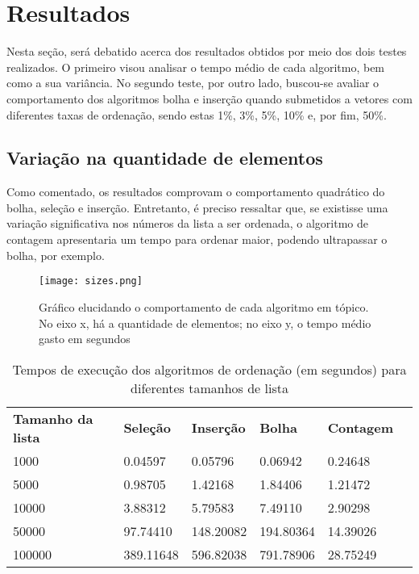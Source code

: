 \section{Resultados}
Nesta seção, será debatido acerca dos resultados obtidos por meio dos dois testes realizados. O primeiro visou analisar o tempo médio de cada algoritmo, bem como a sua variância. 
No segundo teste, por outro lado, buscou-se avaliar o comportamento dos algoritmos bolha e inserção quando submetidos a vetores com diferentes taxas de ordenação, sendo estas 1\%, 3\%, 5\%, 10\% e, por fim, 50\%. 


\subsection{Variação na quantidade de elementos}
Como comentado, os resultados comprovam o comportamento quadrático do bolha, seleção e inserção. 
Entretanto, é preciso ressaltar que, se existisse uma variação significativa nos números da lista a ser ordenada, o algoritmo de contagem apresentaria um tempo para ordenar maior, podendo ultrapassar o bolha, por exemplo.

\begin{figure}[h]
    \texttt{[image: sizes.png]}
    \caption{Gráfico elucidando o comportamento de cada algoritmo em tópico. No eixo x, há a quantidade de elementos; no eixo y, o tempo médio gasto em segundos}
    \end{figure}

    \begin{table}[h]
        \begin{tabular}{llllll}
            \textbf{Tamanho da lista} & \textbf{Seleção} & \textbf{Inserção} & \textbf{Bolha} & \textbf{Contagem} \\
            1000 & 0.04597 & 0.05796 & 0.06942 & 0.24648 \\
            5000 & 0.98705 & 1.42168 & 1.84406 & 1.21472 \\
            10000 & 3.88312 & 5.79583 & 7.49110 & 2.90298 \\
            50000 & 97.74410 & 148.20082 & 194.80364 & 14.39026 \\
            100000 & 389.11648 & 596.82038 & 791.78906 & 28.75249 \\
        \end{tabular}
        \caption{Tempos de execução dos algoritmos de ordenação (em segundos) para diferentes tamanhos de lista}
        \label{tab:tempos_algoritmos}
    \end{table}

